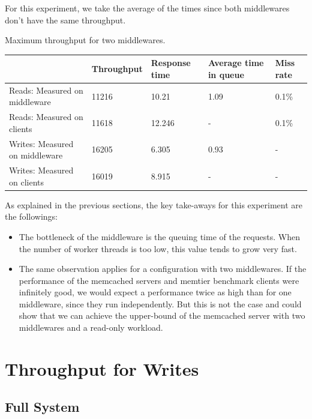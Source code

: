 \documentclass[11pt,a4paper]{article}
\begin{document}
For this experiment, we take the average of the times since both middlewares don't have the same throughput. 
\begin{center}
	{Maximum throughput for two middlewares.}
	\begin{tabular}{|l|p{2cm}|p{2cm}|p{2cm}|p{2cm}|}
		\hline                                & Throughput & Response time & Average time in queue & Miss rate \\ 
		\hline Reads: Measured on middleware  &11216            &10.21               &1.09                       &0.1\%           \\
		\hline Reads: Measured on clients     & 11618            &12.246               &-                   &0.1\%           \\ 
		\hline Writes: Measured on middleware &16205            &6.305               &0.93                       &-       \\ 
		\hline Writes: Measured on clients    &16019            &8.915               &-                   &-       \\ 
		\hline 
	\end{tabular}
\end{center}

As explained in the previous sections, the key take-aways for this experiment are the followings:

\begin{itemize}
\item The bottleneck of the middleware is the queuing time of the requests. When the number of worker threads is too low, this value tends to grow very fast.  
\item The same observation applies for a configuration with two middlewares. If the performance of the memcached servers and memtier benchmark clients were infinitely good, we would expect a performance twice as high than for one middleware, since they run independently. But this is not the case and could show that we can achieve the upper-bound of the memcached server with two middlewares and a read-only workload. 
\end{itemize}
\newpage

\section{Throughput for Writes}

\subsection{Full System}
\end{document}
